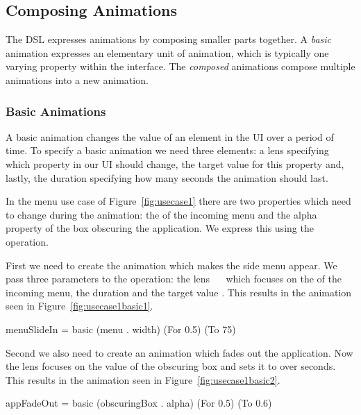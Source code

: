 \subsection{Composing Animations}

The DSL expresses animations by composing smaller parts together. A \emph{basic} animation expresses an elementary unit of animation, which is typically one varying property within the interface. The \emph{composed} animations compose multiple animations into a new animation.

\subsubsection{Basic Animations}

A basic animation changes the value of an element in the UI over a period of time. To specify a basic animation we need three elements: a lens specifying which property in our UI should change, the target value for this property and, lastly, the duration specifying how many seconds the animation should last.

In the menu use case of Figure~\ref{fig:usecase1} there are two properties which need to change during the animation: the  of the incoming menu and the alpha property of the box obscuring the application. We express this using the  operation.

First we need to create the animation which makes the side menu appear. We pass three parameters to the  operation: the lens ~~ which focuses on the  of the incoming menu, the duration  and the target value . This results in the animation seen in Figure~\ref{fig:usecase1basic1}.

\begin{spec}
menuSlideIn = basic (menu . width) (For 0.5) (To 75)
\end{spec}

Second we also need to create an animation which fades out the application. Now the lens focuses on the  value of the obscuring box and sets it to  over  seconds. This results in the animation seen in Figure~\ref{fig:usecase1basic2}.

\begin{spec}
appFadeOut = basic (obscuringBox . alpha) (For 0.5) (To 0.6)
\end{spec}

